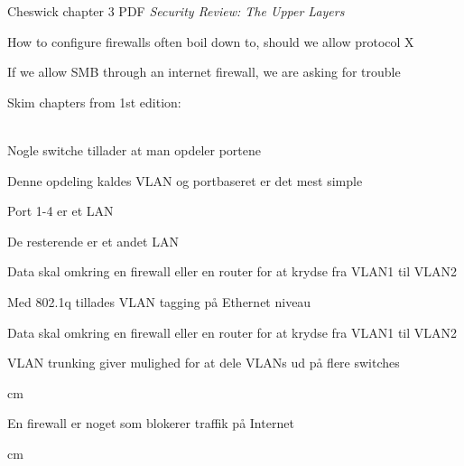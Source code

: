 \documentclass[Screen16to9,17pt]{foils}
\begin{document}

\begin{list1}
\item {} Cheswick chapter 3 PDF
\emph{Security Review: The Upper Layers}
\begin{list2}
\item How to configure firewalls often boil down to, should we allow protocol X
\item If we allow SMB through an internet firewall, we are asking for trouble
\end{list2}
\end{list1}

Skim chapters from 1st edition:\\
\\ 




\begin{list1}
\item Nogle switche tillader at man opdeler portene
\item Denne opdeling kaldes VLAN og portbaseret er det mest simple
\item Port 1-4 er et LAN
\item De resterende er et andet LAN
\item Data skal omkring en firewall eller en router for at krydse fra VLAN1 til VLAN2
\end{list1}



\begin{list1}
\item Med 802.1q tillades VLAN tagging på Ethernet niveau
\item Data skal omkring en firewall eller en router for at krydse fra VLAN1 til VLAN2
\item VLAN trunking giver mulighed for at dele VLANs ud på flere switches
\end{list1}



 cm
\centerline{\hlkbig En firewall er noget som {\color{security6blue}blokerer}
  traffik på Internet}

 cm
\pause
\end{document}

